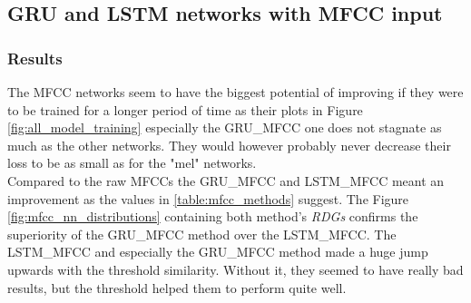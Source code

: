 \subsection{GRU and LSTM networks with MFCC input}

\subsubsection{Results}

The MFCC networks seem to have the biggest potential of improving if they were to be trained for a longer period of time as their plots in Figure \ref{fig:all_model_training} especially the GRU\_MFCC one does not stagnate as much as the other networks. They would however probably never decrease their loss to be as small as for the "mel" networks. \\
Compared to the raw MFCCs the GRU\_MFCC and LSTM\_MFCC meant an improvement as the values in \ref{table:mfcc_methods} suggest. The Figure \ref{fig:mfcc_nn_distributions} containing both method's \textit{RDGs} confirms the superiority of the GRU\_MFCC method over the LSTM\_MFCC. The LSTM\_MFCC and especially the GRU\_MFCC method made a huge jump upwards with the threshold similarity. Without it, they seemed to have really bad results, but the threshold helped them to perform quite well.

